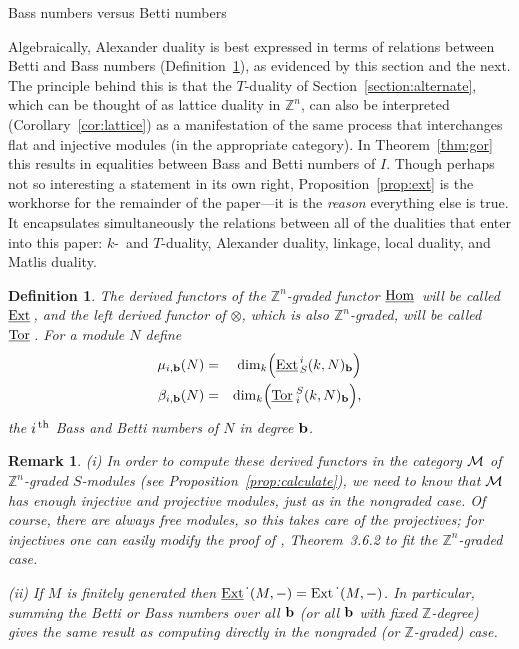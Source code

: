 \documentclass[12pt,leqno]{article}
\newtheorem{defn}[thm]{Definition}
\newtheorem{remark}[thm]{Remark}
\def\hhom{{{\underline{\rm Hom}}{\scriptscriptstyle \,}}}
\def\eext{{{\underline{\rm Ext}}{\scriptscriptstyle \,}}}
\def\ttor{{{\underline{\rm Tor}}{\scriptstyle \;}}}
\def\bb{{{\rm \bf b}}}
\def\ZZ{{\mathbb Z}}
\begin{document}
\begin{section}{Bass numbers versus Betti numbers}%


\label{section:bass-betti}

\noindent
Algebraically, Alexander duality is best expressed in terms of relations
between Betti and Bass numbers (Definition~\ref{defn:bass-betti}), as
evidenced by this section and the next.  The principle behind this is
that the $T$-duality of Section~\ref{section:alternate}, which can be
thought of as lattice duality in $\ZZ^n$, can also be interpreted
(Corollary~\ref{cor:lattice}) as a manifestation of the same process that
interchanges flat and injective modules (in the appropriate category).
In Theorem~\ref{thm:gor} this results in equalities between Bass and
Betti numbers of $I$.  Though perhaps not so interesting a statement in
its own right, Proposition~\ref{prop:ext} is the workhorse for the
remainder of the paper---it is the {\it reason} everything else is true.
It encapsulates simultaneously the relations between all of the dualities
that enter into this paper: $k$-\ and $T$-duality, Alexander duality,
linkage, local duality, and Matlis duality.

\begin{defn} \label{defn:bass-betti}
The derived functors of the $\ZZ^n$-graded functor $\hhom$ will be called
$\eext$, and the left derived functor of $\otimes$, which is also
$\ZZ^n$-graded, will be called $\ttor$.  For a module $N$ define
\begin{eqnarray*}
  \mu_{i,\bb}(N)   & = & \dim_k \Bigl(\eext^i_S(k,N)_\bb \Bigr) \cr
  \beta_{i,\bb}(N) & = & \dim_k \Bigl(\ttor_i^S(k,N)_\bb \Bigr),
\end{eqnarray*}
the {\rm $i^{\rm \,th}$ Bass and Betti numbers of $N$ in degree $\bb$}.
\end{defn}
\begin{remark} \label{rk:derived} \rm
(i) In order to compute these derived functors in the category $\cal M$
of $\ZZ^n$-graded $S$-modules (see Proposition~\ref{prop:calculate}), we
need to know that $\cal M$ has enough injective and projective modules,
just as in the nongraded case.  Of course, there are always free modules,
so this takes care of the projectives; for injectives one can easily
modify the proof of \cite{BH}, Theorem~3.6.2 to fit the $\ZZ^n$-graded
case.

\vskip 1mm \noindent
(ii) If $M$ is finitely generated then $\eext^{\textstyle \cdot}(M,-) =
{\rm Ext\,}^{\textstyle \cdot}(M,-)$.  In particular, summing the Betti
or Bass numbers over all $\bb$ (or all $\bb$ with fixed $\ZZ$-degree)
gives the same result as computing directly in the nongraded (or
$\ZZ$-graded) case.
\end{remark}


\end{section}
\end{document}
